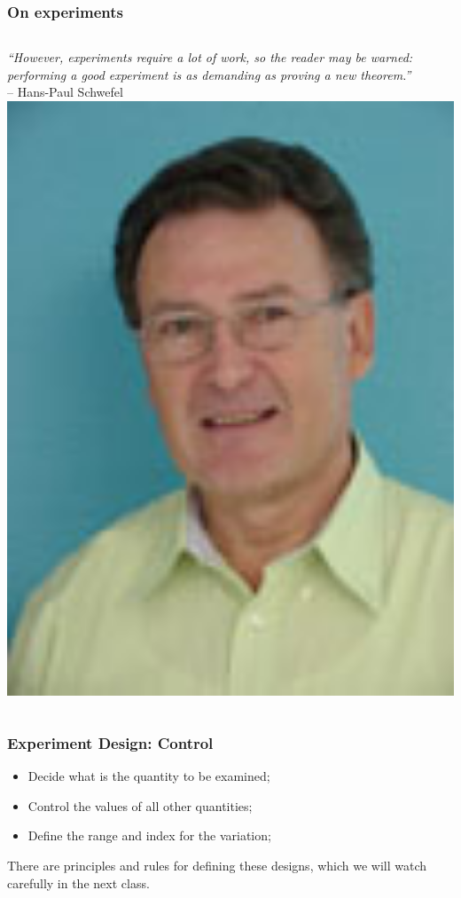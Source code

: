 \documentclass{beamer}
\begin{document}
\begin{frame}
  \frametitle{On experiments}
  \vfill
  \begin{block}{}
    \begin{columns}[c]
      {\footnotesize {\it``However, experiments require a lot of
      work, so the reader may be warned: performing a good experiment
      is as demanding as proving a new theorem.''}\\
      -- Hans-Paul Schwefel}
      \includegraphics[width=1\textwidth]{img/schwefel}
    \end{columns}
  \end{block}
\end{frame}

\begin{frame}
  \frametitle{Experiment Design: Control} %

  \begin{itemize}
  \item Decide what is the quantity to be examined;
  \item Control the values of all other quantities;
  \item Define the range and index for the variation;
  \end{itemize}
  \begin{block}{}
    There are principles and rules for defining these designs, which
    we will watch carefully in the next class.
  \end{block}
\end{frame}
\end{document}
